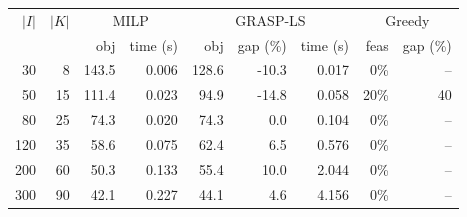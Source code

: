 \begin{tabular}{rrrrrrrrr}
\toprule
$|I|$ & $|K|$ & \multicolumn{2}{c}{MILP} & \multicolumn{3}{c}{GRASP-LS} & \multicolumn{2}{c}{Greedy} \\
      &       & obj & time (s) & obj & gap (\%) & time (s) & feas & gap (\%) \\
\midrule
30 & 8 & 143.5 & 0.006 & 128.6 & -10.3 & 0.017 & 0\% & -- \\
50 & 15 & 111.4 & 0.023 & 94.9 & -14.8 & 0.058 & 20\% & 40 \\
80 & 25 & 74.3 & 0.020 & 74.3 & 0.0 & 0.104 & 0\% & -- \\
120 & 35 & 58.6 & 0.075 & 62.4 & 6.5 & 0.576 & 0\% & -- \\
200 & 60 & 50.3 & 0.133 & 55.4 & 10.0 & 2.044 & 0\% & -- \\
300 & 90 & 42.1 & 0.227 & 44.1 & 4.6 & 4.156 & 0\% & -- \\
\bottomrule
\end{tabular}